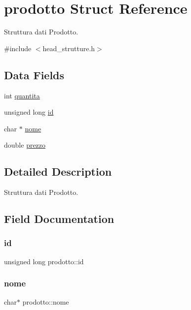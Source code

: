 \hypertarget{structprodotto}{}\section{prodotto Struct Reference}
\label{structprodotto}


Struttura dati Prodotto.  




{\ttfamily \#include $<$head\+\_\+strutture.\+h$>$}

\subsection*{Data Fields}
\begin{DoxyCompactItemize}
\item 
int \hyperlink{structprodotto_a534126552a4446bb902bee13404dce29}{quantita}
\item 
unsigned long \hyperlink{structprodotto_a50d334c43c395f89606cb139979e7307}{id}
\item 
char $\ast$ \hyperlink{structprodotto_afe6a9517f568fc0920fc2597740b5f96}{nome}
\item 
double \hyperlink{structprodotto_a7ab3f5c685551ed46abb214bc2f43aac}{prezzo}
\end{DoxyCompactItemize}


\subsection{Detailed Description}
Struttura dati Prodotto. 

\subsection{Field Documentation}
\mbox{\label{structprodotto_a50d334c43c395f89606cb139979e7307}} 
\subsubsection{\texorpdfstring{id}{id}}
{\footnotesize\ttfamily unsigned long prodotto\+::id}

\mbox{\label{structprodotto_afe6a9517f568fc0920fc2597740b5f96}} 
\subsubsection{\texorpdfstring{nome}{nome}}
{\footnotesize\ttfamily char$\ast$ prodotto\+::nome}

